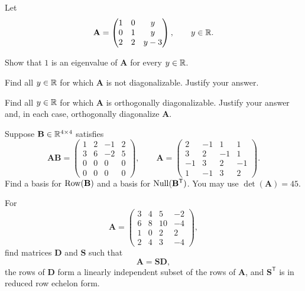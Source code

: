 \begin{problem}
Let
\[
\mathbf A=
\begin{pmatrix}
1&0&y\\
0&1&y\\
2&2&y-3
\end{pmatrix},
\qquad y\in\mathbb{R}.
\]
\begin{problemsubparts}
\item Show that $1$ is an eigenvalue of $\mathbf A$ for every $y\in\mathbb{R}$.
\item Find all $y\in\mathbb{R}$ for which $\mathbf A$ is not diagonalizable. Justify your answer.
\item Find all $y\in\mathbb{R}$ for which $\mathbf A$ is orthogonally diagonalizable. Justify your answer and, in each case, orthogonally diagonalize $\mathbf A$.
\end{problemsubparts}
\end{problem}

\begin{problem}
Suppose $\mathbf B\in\mathbb{R}^{4\times4}$ satisfies
\[
\mathbf A\mathbf B=
\begin{pmatrix}
1&2&-1&2\\
3&6&-2&5\\
0&0&0&0\\
0&0&0&0
\end{pmatrix},
\qquad
\mathbf A=
\begin{pmatrix}
2&-1&1&1\\
3&2&-1&1\\
-1&3&2&-1\\
1&-1&3&2
\end{pmatrix}.
\]
Find a basis for $\operatorname{Row}(\mathbf B)$ and a basis for $\operatorname{Null}(\mathbf B^{\mathsf T})$. You may use $\det(\mathbf A)=45$.
\end{problem}

\begin{problem}
For
\[
\mathbf A=
\begin{pmatrix}
3&4&5&-2\\
6&8&10&-4\\
1&0&2&2\\
2&4&3&-4
\end{pmatrix},
\]
find matrices $\mathbf D$ and $\mathbf S$ such that
\[
\mathbf A=\mathbf S\mathbf D,
\]
the rows of $\mathbf D$ form a linearly independent subset of the rows of $\mathbf A$, and $\mathbf S^{\mathsf T}$ is in reduced row echelon form.
\end{problem}

